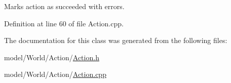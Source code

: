 Marks action as succeeded with errors. 



Definition at line 60 of file Action.\-cpp.



The documentation for this class was generated from the following files\-:\begin{DoxyCompactItemize}
\item 
model/\-World/\-Action/\hyperlink{Action_8h}{Action.\-h}\item 
model/\-World/\-Action/\hyperlink{Action_8cpp}{Action.\-cpp}\end{DoxyCompactItemize}
